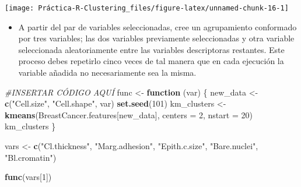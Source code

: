 \documentclass[]{article}
\newenvironment{Shaded}{\begin{snugshade}}{\end{snugshade}}
\newcommand{\CommentTok}[1]{\textcolor[rgb]{0.56,0.35,0.01}{\textit{#1}}}
\newcommand{\ControlFlowTok}[1]{\textcolor[rgb]{0.13,0.29,0.53}{\textbf{#1}}}
\newcommand{\DataTypeTok}[1]{\textcolor[rgb]{0.13,0.29,0.53}{#1}}
\newcommand{\DecValTok}[1]{\textcolor[rgb]{0.00,0.00,0.81}{#1}}
\newcommand{\KeywordTok}[1]{\textcolor[rgb]{0.13,0.29,0.53}{\textbf{#1}}}
\newcommand{\NormalTok}[1]{#1}
\newcommand{\StringTok}[1]{\textcolor[rgb]{0.31,0.60,0.02}{#1}}
\providecommand{\tightlist}{%
  \setlength{\itemsep}{0pt}\setlength{\parskip}{0pt}}
\begin{document}
\begin{center}\texttt{[image: Práctica-R-Clustering\_files/figure-latex/unnamed-chunk-16-1]} \end{center}

\begin{itemize}
\tightlist
\item
  A partir del par de variables seleccionadas, cree un agrupamiento
  conformado por tres variables; las dos variables previamente
  seleccionadas y otra variable seleccionada aleatoriamente entre las
  variables descriptoras restantes. Este proceso debes repetirlo cinco
  veces de tal manera que en cada ejecución la variable añadida no
  necesariamente sea la misma.
\end{itemize}

\begin{Shaded}
\begin{Highlighting}[]
\CommentTok{#INSERTAR CÓDIGO AQUÍ}
\NormalTok{func <-}\StringTok{ }\ControlFlowTok{function}\NormalTok{ (var) \{ }
\NormalTok{  new_data <-}\StringTok{ }\KeywordTok{c}\NormalTok{(}\StringTok{"Cell.size"}\NormalTok{, }\StringTok{"Cell.shape"}\NormalTok{, var)}
  \KeywordTok{set.seed}\NormalTok{(}\DecValTok{101}\NormalTok{)}
\NormalTok{  km_clusters <-}\StringTok{ }\KeywordTok{kmeans}\NormalTok{(BreastCancer.features[new_data], }\DataTypeTok{centers =} \DecValTok{2}\NormalTok{, }\DataTypeTok{nstart =} \DecValTok{20}\NormalTok{)}
\NormalTok{  km_clusters}
\NormalTok{\}}

\NormalTok{vars <-}\StringTok{ }\KeywordTok{c}\NormalTok{(}\StringTok{"Cl.thickness"}\NormalTok{, }\StringTok{"Marg.adhesion"}\NormalTok{, }\StringTok{"Epith.c.size"}\NormalTok{, }\StringTok{"Bare.nuclei"}\NormalTok{, }\StringTok{"Bl.cromatin"}\NormalTok{)}

\KeywordTok{func}\NormalTok{(vars[}\DecValTok{1}\NormalTok{])}
\end{Highlighting}
\end{Shaded}
\end{document}
